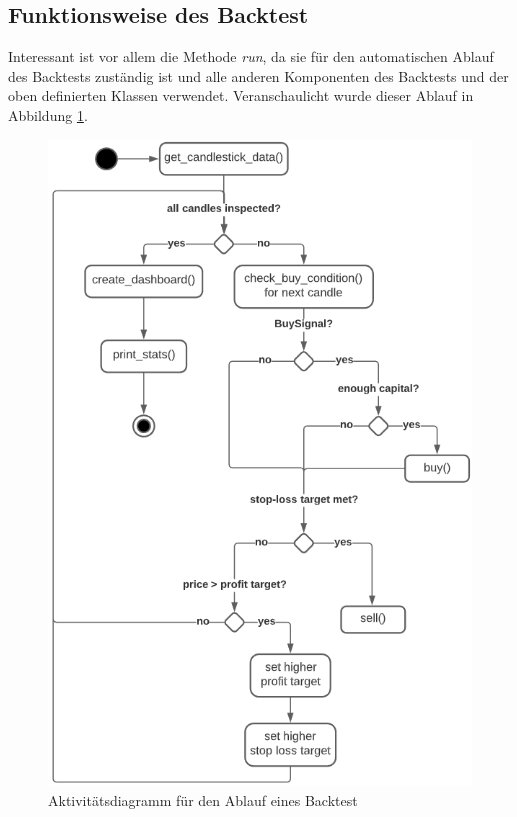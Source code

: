 \documentclass[oneside]{ausarbeitung}
\begin{document}
\subsection{Funktionsweise des Backtest}
\label{sub:funktionsweise_des_backtest}

Interessant ist vor allem die Methode \textit{run}, da sie für den automatischen Ablauf des Backtests zuständig ist und alle anderen Komponenten des Backtests und der oben definierten Klassen verwendet. 
Veranschaulicht wurde dieser Ablauf in Abbildung \ref{fig:13}.

\begin{figure}[H]
  \centering
  \includegraphics[height=1\textheight]{uml/backtest_activity_uml.png}
  \caption{Aktivitätsdiagramm für den Ablauf eines Backtest}
  \label{fig:13}
\end{figure}
\end{document}

